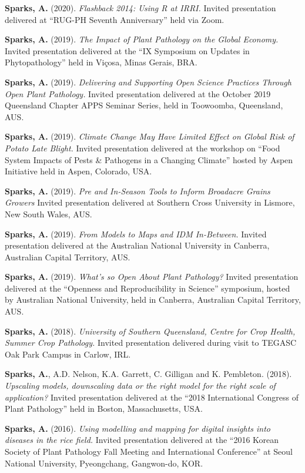\documentclass[11pt, a4paper]{awesome-cv}
\begin{document}
\begingroup
\setlength{\parindent}{-0.5in}
\setlength{\leftskip}{0.5in}

\textbf{Sparks, A.} (2020). \emph{Flashback 2014: Using R at IRRI.}
Invited presentation delivered at ``RUG-PH Seventh Anniversary'' held
via Zoom.

\textbf{Sparks, A.} (2019). \emph{The Impact of Plant Pathology on the
Global Economy.} Invited presentation delivered at the ``IX Symposium on
Updates in Phytopathology'' held in Viçosa, Minas Gerais, BRA.

\textbf{Sparks, A.} (2019). \emph{Delivering and Supporting Open Science
Practices Through Open Plant Pathology.} Invited presentation delivered
at the October 2019 Queensland Chapter APPS Seminar Series, held in
Toowoomba, Queensland, AUS.

\textbf{Sparks, A.} (2019). \emph{Climate Change May Have Limited Effect
on Global Risk of Potato Late Blight.} Invited presentation delivered at
the workshop on ``Food System Impacts of Pests \& Pathogens in a
Changing Climate'' hosted by Aspen Initiative held in Aspen, Colorado,
USA.

\textbf{Sparks, A.} (2019). \emph{Pre and In-Season Tools to Inform
Broadacre Grains Growers} Invited presentation delivered at Southern
Cross University in Lismore, New South Wales, AUS.

\textbf{Sparks, A.} (2019). \emph{From Models to Maps and IDM
In-Between.} Invited presentation delivered at the Australian National
University in Canberra, Australian Capital Territory, AUS.

\textbf{Sparks, A.} (2019). \emph{What's so Open About Plant Pathology?}
Invited presentation delivered at the ``Openness and Reproducibility in
Science'' symposium, hosted by Australian National University, held in
Canberra, Australian Capital Territory, AUS.

\textbf{Sparks, A.} (2018). \emph{University of Southern Queensland,
Centre for Crop Health, Summer Crop Pathology.} Invited presentation
delivered during visit to TEGASC Oak Park Campus in Carlow, IRL.

\textbf{Sparks, A.}, A.D. Nelson, K.A. Garrett, C. Gilligan and K.
Pembleton. (2018). \emph{Upscaling models, downscaling data or the right
model for the right scale of application?} Invited presentation
delivered at the ``2018 International Congress of Plant Pathology'' held
in Boston, Massachusetts, USA.

\textbf{Sparks, A.} (2016). \emph{Using modelling and mapping for
digital insights into diseases in the rice field.} Invited presentation
delivered at the ``2016 Korean Society of Plant Pathology Fall Meeting
and International Conference'' at Seoul National University,
Pyeongchang, Gangwon-do, KOR.
\end{document}
